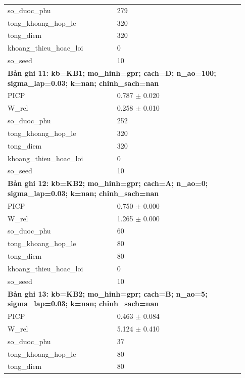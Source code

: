 \begin{longtable}{p{0.43\linewidth}p{0.50\linewidth}}
so\_\allowbreak duoc\_\allowbreak phu & 279 \\
tong\_\allowbreak khoang\_\allowbreak hop\_\allowbreak le & 320 \\
tong\_\allowbreak diem & 320 \\
khoang\_\allowbreak thieu\_\allowbreak hoac\_\allowbreak loi & 0 \\
so\_\allowbreak seed & 10 \\
\midrule
\multicolumn{2}{p{0.95\linewidth}}{\textbf{Bản ghi 11: kb=KB1; mo\_hinh=gpr; cach=D; n\_ao=100; sigma\_lap=0.03; k=nan; chinh\_sach=nan}} \\
PICP & 0.787 $\pm$ 0.020 \\
W\_\allowbreak rel & 0.258 $\pm$ 0.010 \\
so\_\allowbreak duoc\_\allowbreak phu & 252 \\
tong\_\allowbreak khoang\_\allowbreak hop\_\allowbreak le & 320 \\
tong\_\allowbreak diem & 320 \\
khoang\_\allowbreak thieu\_\allowbreak hoac\_\allowbreak loi & 0 \\
so\_\allowbreak seed & 10 \\
\midrule
\multicolumn{2}{p{0.95\linewidth}}{\textbf{Bản ghi 12: kb=KB2; mo\_hinh=gpr; cach=A; n\_ao=0; sigma\_lap=0.03; k=nan; chinh\_sach=nan}} \\
PICP & 0.750 $\pm$ 0.000 \\
W\_\allowbreak rel & 1.265 $\pm$ 0.000 \\
so\_\allowbreak duoc\_\allowbreak phu & 60 \\
tong\_\allowbreak khoang\_\allowbreak hop\_\allowbreak le & 80 \\
tong\_\allowbreak diem & 80 \\
khoang\_\allowbreak thieu\_\allowbreak hoac\_\allowbreak loi & 0 \\
so\_\allowbreak seed & 10 \\
\midrule
\multicolumn{2}{p{0.95\linewidth}}{\textbf{Bản ghi 13: kb=KB2; mo\_hinh=gpr; cach=B; n\_ao=5; sigma\_lap=0.03; k=nan; chinh\_sach=nan}} \\
PICP & 0.463 $\pm$ 0.084 \\
W\_\allowbreak rel & 5.124 $\pm$ 0.410 \\
so\_\allowbreak duoc\_\allowbreak phu & 37 \\
tong\_\allowbreak khoang\_\allowbreak hop\_\allowbreak le & 80 \\
tong\_\allowbreak diem & 80 \\

\end{longtable}

